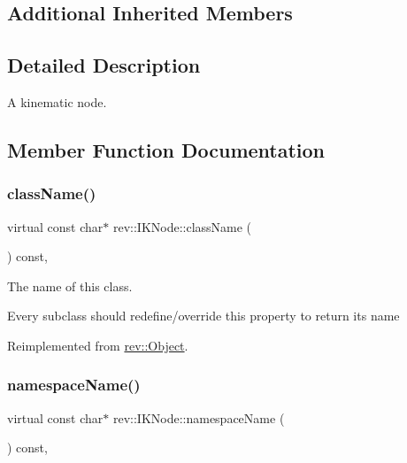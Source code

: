 \subsection*{Additional Inherited Members}


\subsection{Detailed Description}
A kinematic node. 

\subsection{Member Function Documentation}
\mbox{\label{classrev_1_1_i_k_node_a2105ed436df5a05daa873cfa83ca42d4}} 
\subsubsection{\texorpdfstring{className()}{className()}}
{\footnotesize\ttfamily virtual const char$\ast$ rev\+::\+I\+K\+Node\+::class\+Name (\begin{DoxyParamCaption}{ }\end{DoxyParamCaption}) const\hspace{0.3cm}{\ttfamily [inline]}, {\ttfamily [virtual]}}



The name of this class. 

Every subclass should redefine/override this property to return its name 

Reimplemented from \mbox{\hyperlink{classrev_1_1_object_a7a2013f91169479b65cf93afdc5d9a68}{rev\+::\+Object}}.

\mbox{\label{classrev_1_1_i_k_node_a0673db5b3a78a10ce70a7575f82fbc19}} 
\subsubsection{\texorpdfstring{namespaceName()}{namespaceName()}}
{\footnotesize\ttfamily virtual const char$\ast$ rev\+::\+I\+K\+Node\+::namespace\+Name (\begin{DoxyParamCaption}{ }\end{DoxyParamCaption}) const\hspace{0.3cm}{\ttfamily [inline]}, {\ttfamily [virtual]}}



